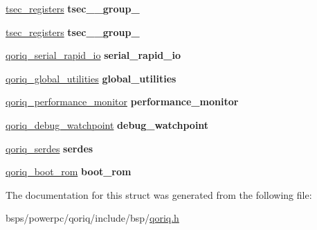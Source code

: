 \begin{DoxyCompactItemize}
\item 
\mbox{\label{structqoriq__ccsr_adeacd45cfa3853d0b87357523ecacd4b}} 
\mbox{\hyperlink{structtsec__registers}{tsec\+\_\+registers}} {\bfseries tsec\+\_\+\_\+group\+\_}
\item 
\mbox{\label{structqoriq__ccsr_acd5a927f9b3056364cd23f826e6cf4d6}} 
\mbox{\hyperlink{structtsec__registers}{tsec\+\_\+registers}} {\bfseries tsec\+\_\+\_\+group\+\_}
\item 
\mbox{\label{structqoriq__ccsr_a5afd51d68828e4f246c26cf60d6e0c7a}} 
\mbox{\hyperlink{structqoriq__serial__rapid__io}{qoriq\+\_\+serial\+\_\+rapid\+\_\+io}} {\bfseries serial\+\_\+rapid\+\_\+io}
\item 
\mbox{\label{structqoriq__ccsr_a4cd12da81519cd8dab0aa4f6c272084c}} 
\mbox{\hyperlink{structqoriq__global__utilities}{qoriq\+\_\+global\+\_\+utilities}} {\bfseries global\+\_\+utilities}
\item 
\mbox{\label{structqoriq__ccsr_aceea0fe3597c25a6e0b5d5ec44e9a047}} 
\mbox{\hyperlink{structqoriq__performance__monitor}{qoriq\+\_\+performance\+\_\+monitor}} {\bfseries performance\+\_\+monitor}
\item 
\mbox{\label{structqoriq__ccsr_a3d84abb0dde6070baa0912d1235fca0c}} 
\mbox{\hyperlink{structqoriq__debug__watchpoint}{qoriq\+\_\+debug\+\_\+watchpoint}} {\bfseries debug\+\_\+watchpoint}
\item 
\mbox{\label{structqoriq__ccsr_a2f5ed6e8d1604eaea8c09098f0c3e584}} 
\mbox{\hyperlink{structqoriq__serdes}{qoriq\+\_\+serdes}} {\bfseries serdes}
\item 
\mbox{\label{structqoriq__ccsr_a19aabc907a042ee065a4a129a4a08781}} 
\mbox{\hyperlink{structqoriq__boot__rom}{qoriq\+\_\+boot\+\_\+rom}} {\bfseries boot\+\_\+rom}
\end{DoxyCompactItemize}


The documentation for this struct was generated from the following file\+:\begin{DoxyCompactItemize}
\item 
bsps/powerpc/qoriq/include/bsp/\mbox{\hyperlink{qoriq_8h}{qoriq.\+h}}\end{DoxyCompactItemize}
